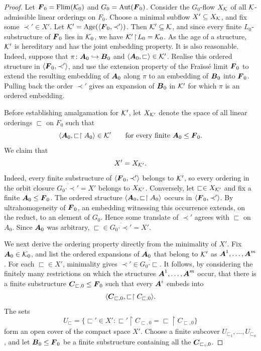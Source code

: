 \begin{proof}
    Let \(\boldsymbol{F}_0=\operatorname{Flim}(\mathcal{K}_0)\) and \(G_0=\operatorname{Aut}(\boldsymbol{F}_0)\). Consider the \(G_0\)-flow \(X_{\mathcal{K}}\) of all \(\mathcal{K}\)-admissible linear orderings on \(F_0\). Choose a minimal subflow \(X'\subseteq X_{\mathcal{K}}\), and fix some \(\prec'\in X'\). Let \(\mathcal{K}'=\operatorname{Age}(\langle \boldsymbol{F}_0,\prec'\rangle)\).
    Then \(\mathcal{K}'\subseteq\mathcal{K}\), and since every finite \(L_0\)-substructure of \(\boldsymbol{F}_0\) lies in \(\mathcal{K}_0\), we have \(\mathcal{K}'\!\restriction\!L_0=\mathcal{K}_0\).
    As the age of a structure, \(\mathcal{K}'\) is hereditary and has the joint
    embedding property. It is also reasonable. Indeed, suppose that
    \(\pi\colon\boldsymbol{A}_0\hookrightarrow\boldsymbol{B}_0\) and
    \(\langle\boldsymbol{A}_0,\sqsubset\rangle\in\mathcal{K}'\). Realise this ordered structure
    in \(\langle\boldsymbol{F}_0,\prec'\rangle\), and use the extension property of the
    Fraïssé limit \(\boldsymbol{F}_0\) to extend the resulting embedding of \(\boldsymbol{A}_0\)
    along \(\pi\) to an embedding of \(\boldsymbol{B}_0\) into \(\boldsymbol{F}_0\). Pulling back
    the order \(\prec'\) gives an expansion of \(\boldsymbol{B}_0\) in \(\mathcal{K}'\) for
    which \(\pi\) is an ordered embedding.

    Before establishing amalgamation for \(\mathcal{K}'\), let \(X_{\mathcal{K}'}\) denote the
    space of all linear orderings \(\sqsubset\) on \(F_0\) such that
    \[
        \langle\boldsymbol{A}_0,\sqsubset\restriction A_0\rangle\in\mathcal{K}'
        \qquad\text{for every finite }\boldsymbol{A}_0\leq\boldsymbol{F}_0.
    \]
    We claim that
    \[
        X'=X_{\mathcal{K}'}.
    \]
    Indeed, every finite substructure of \(\langle\boldsymbol{F}_0,\prec'\rangle\) belongs
    to \(\mathcal{K}'\), so every ordering in the orbit closure
    \(\overline{G_0\cdot\prec'}=X'\) belongs to \(X_{\mathcal{K}'}\). Conversely, let
    \(\sqsubset\in X_{\mathcal{K}'}\) and fix a finite \(\boldsymbol{A}_0\leq\boldsymbol{F}_0\). The
    ordered structure \(\langle\boldsymbol{A}_0,\sqsubset\restriction A_0\rangle\) occurs
    in \(\langle\boldsymbol{F}_0,\prec'\rangle\). By ultrahomogeneity of \(\boldsymbol{F}_0\), an
    embedding witnessing this occurrence extends, on the reduct, to an element
    of \(G_0\). Hence some translate of \(\prec'\) agrees with \(\sqsubset\) on
    \(A_0\). Since \(\boldsymbol{A}_0\) was arbitrary,
    \(\sqsubset\in\overline{G_0\cdot\prec'}=X'\).

    We next derive the ordering property directly from the minimality of \(X'\).
    Fix \(\boldsymbol{A}_0\in\mathcal{K}_0\), and list the ordered expansions of \(\boldsymbol{A}_0\) that
    belong to \(\mathcal{K}'\) as \(\boldsymbol{A}^1,\dots,\boldsymbol{A}^m\). For each
    \(\sqsubset\in X'\), minimality gives
    \(\prec'\in\overline{G_0\cdot\sqsubset}\). It follows, by considering the
    finitely many restrictions on which the structures \(\boldsymbol{A}^1,\dots,\boldsymbol{A}^m\)
    occur, that there is a finite substructure
    \(\boldsymbol{C}_{\sqsubset,0}\leq\boldsymbol{F}_0\) such that every \(\boldsymbol{A}^i\) embeds into
    \[
        \langle\boldsymbol{C}_{\sqsubset,0},
        \sqsubset\restriction C_{\sqsubset,0}\rangle.
    \]
    The sets
    \[
        U_{\sqsubset}
        =
        \{\sqsubset'\in X' :
        \sqsubset'\restriction C_{\sqsubset,0}
        =\sqsubset\restriction C_{\sqsubset,0}\}
    \]
    form an open cover of the compact space \(X'\). Choose a finite subcover
    \(U_{\sqsubset_1},\dots,U_{\sqsubset_n}\), and let
    \(\boldsymbol{B}_0\leq\boldsymbol{F}_0\) be a finite substructure containing all the
    \(\boldsymbol{C}_{\sqsubset_i,0}\).


\end{proof}
